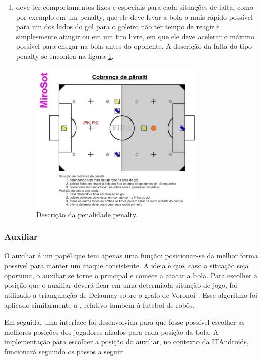 \documentclass[a4paper,12pt]{article}
\begin{document}
\begin{enumerate}
 
\item deve ter comportamentos fixos e especiais para cada situações de falta, como por exemplo em um penalty, que ele deve levar a bola o mais rápido possível para um dos lados do gol para o goleiro não ter tempo de reagir e simplesmente atingir ou em um tiro livre, em que ele deve acelerar o máximo possível para chegar na bola antes do oponente. A descrição da falta do tipo penalty se encontra na figura \ref{fig:penalty}.

\begin{figure}[H]
	\centering
	\includegraphics[width=0.8\textwidth]{figures/campo_penalty.png}
   \caption{Descrição da penalidade penalty.} \label{fig:penalty}
\end{figure}

\end{enumerate}




\subsubsection{Auxiliar} 

O auxiliar é um papél que tem apenas uma função: posicionar-se da melhor forma possível para manter um ataque consistente. A ideia é que, caso a situação seja oportuna, o auxiliar se torne o principal e comece a atacar a bola. Para escolher a posição que o auxiliar deverá ficar em uma determiada situação de jogo, foi utilizado a triangulação de Delaunay \cite{delaunay34} sobre o grafo de Voronoi \cite{voronoi08}. Esse algoritmo foi aplicado similarmente a \cite{akiyama2007multi}, relativo também à futebol de robôs.

Em seguida, uma interface foi desenvolvida para que fosse possível escolher as melhores posições dos jogadores aliados para cada posição da bola. A implementação para escolher a posição do auxiliar, no contexto da ITAndroids, funcionará seguindo os passos a seguir:
\end{document}
